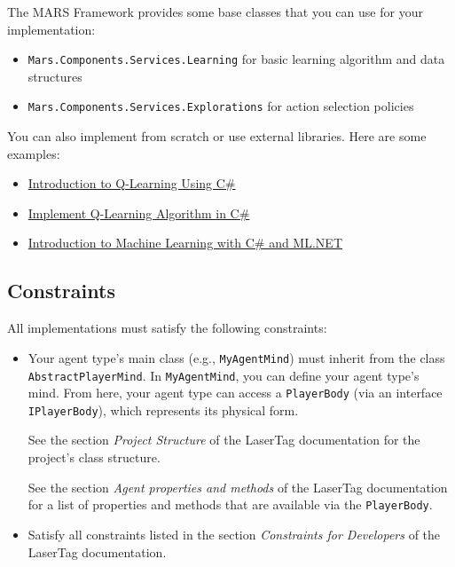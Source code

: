 \documentclass[
    a4paper,
    english,
    DIV=16,
    11pt,
    parskip=half,
]{scrartcl}
\begin{document}
The MARS Framework provides some base classes that you can use for your implementation:
\begin{itemize}
  \item \texttt{Mars.Components.Services.Learning} for basic learning algorithm and data structures
  \item \texttt{Mars.Components.Services.Explorations} for action selection policies
\end{itemize}
You can also implement from scratch or use external libraries. Here are some examples:
\begin{itemize}
  \item \href{https://learn.microsoft.com/en-us/archive/msdn-magazine/2018/august/test-run-introduction-to-q-learning-using-csharp}{Introduction to Q-Learning Using C\#}
  \item \href{https://devindeep.com/how-to-implement-q-learning-algorithm-in-c/}{Implement Q-Learning Algorithm in C\#}
  \item \href{https://rubikscode.net/2022/08/29/machine-learning-with-ml-net-introduction/}{Introduction to Machine Learning with C\# and ML.NET}
\end{itemize}

\subsection*{Constraints}
All implementations must satisfy the following constraints:
\begin{itemize}
  \item Your agent type's main class (e.g., \texttt{MyAgentMind}) must inherit from the class \texttt{AbstractPlayerMind}. In \texttt{MyAgentMind}, you can define your agent type's mind. From here, your agent type can access a \texttt{PlayerBody} (via an interface \texttt{IPlayerBody}), which represents its physical form.
  
  \faLightbulbO\: See the section \emph{Project Structure} of the LaserTag documentation for the project's class structure.
  
  \faLightbulbO\: See the section \emph{Agent properties and methods} of the LaserTag documentation for a list of properties and methods that are available via the \texttt{PlayerBody}.

  \item Satisfy all constraints listed in the section \emph{Constraints for Developers} of the LaserTag documentation.
\end{itemize}
\end{document}
